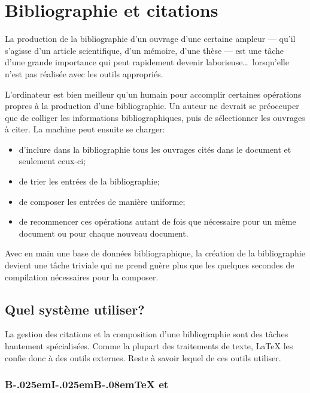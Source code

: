 \chapter{Bibliographie et citations}
\label{chap:bibliographie}

\nobibliography*

La production de la bibliographie d'un ouvrage d'une certaine ampleur
--- qu'il s'agisse d'un article scientifique, d'un mémoire, d'une
thèse --- est une tâche d'une grande importance qui peut rapidement devenir
laborieuse\dots\ lorsqu'elle n'est pas réalisée avec les outils appropriés.

L'ordinateur est bien meilleur qu'un humain pour accomplir certaines
opérations propres à la production d'une bibliographie. Un auteur ne
devrait se préoccuper que de colliger les informations
bibliographiques, puis de sélectionner les ouvrages à citer. La
machine peut ensuite se charger:
\begin{itemize}
\item d'inclure dans la bibliographie tous les ouvrages cités dans le
  document et seulement ceux-ci;
\item de trier les entrées de la bibliographie;
\item de composer les entrées de manière uniforme;
\item de recommencer ces opérations autant de fois que nécessaire pour
  un même document ou pour chaque nouveau document.
\end{itemize}

Avec en main une base de données bibliographique, la création de la
bibliographie devient une tâche triviale qui ne prend guère plus que
les quelques secondes de compilation nécessaires pour la composer.



\section{Quel système utiliser?}
\label{sec:bibliographie:systeme}

La gestion des citations et la composition d'une bibliographie sont
des tâches hautement spécialisées. Comme la plupart des traitements de
texte, {\LaTeX} les confie donc à des outils externes. Reste à savoir
lequel de ces outils utiliser.

\subsection[{\BibTeX} et \pkg{natbib}]{%
  {B\kern-.025em{\small I}\kern-.025em{\small  B}\kern-.08em\TeX} %
  et }
\label{sec:bibliographie:systeme:bibtex}

